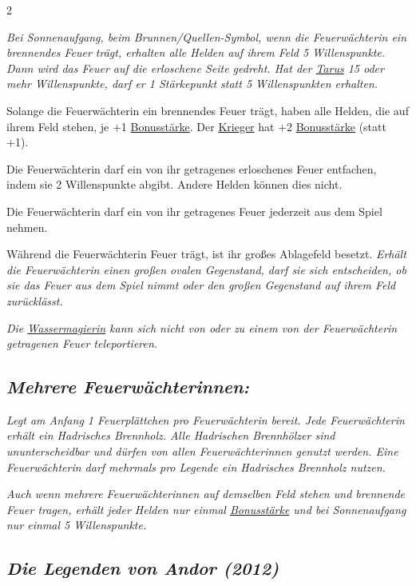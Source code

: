 \documentclass[10pt, a4paper, oneside]{book}
\newcommand{\fan}[1]{\textit{#1}}
\begin{document}
\begin{multicols*}{2}
\begin{nobgcolor}
\fan{Bei Sonnenaufgang, beim Brunnen/Quellen-Symbol, wenn die Feuerwächterin ein brennendes Feuer trägt, erhalten alle Helden auf ihrem Feld 5 Willenspunkte. Dann wird das Feuer auf die erloschene Seite gedreht. Hat der \hyperref[Tarus]{Tarus} 15 oder mehr Willenspunkte, darf er 1 Stärkepunkt statt 5 Willenspunkten erhalten.} 

Solange die Feuerwächterin ein brennendes Feuer trägt, haben alle Helden, die auf ihrem Feld stehen, je +1 \hyperref[Bonusstärke]{Bonusstärke}. Der \hyperref[Krieger]{Krieger} hat +2 \hyperref[Bonusstärke]{Bonusstärke} (statt +1).
\supercite{DeK:Begleitheft} 

Die Feuerwächterin darf ein von ihr getragenes erloschenes Feuer entfachen, indem sie 2 Willenspunkte abgibt.\supercite{DeK:Begleitheft} Andere Helden können dies nicht.\supercite{105294}

Die Feuerwächterin darf ein von ihr getragenes Feuer jederzeit aus dem Spiel nehmen.
\supercite{117803}

Während die Feuerwächterin Feuer trägt, ist ihr großes Ablagefeld besetzt. \fan{Erhält die Feuerwächterin einen großen ovalen Gegenstand, darf sie sich entscheiden, ob sie das Feuer aus dem Spiel nimmt oder den großen Gegenstand auf ihrem Feld zurücklässt.}

\fan{Die \hyperref[Wassermagierin]{Wassermagierin} kann sich nicht von oder zu einem von der Feuerwächterin getragenen Feuer teleportieren.}


\columnbreak
\subsection{\fan{Mehrere Feuerwächterinnen:}}

\fan{Legt am Anfang 1 Feuerplättchen pro Feuerwächterin bereit. Jede Feuerwächterin erhält ein Hadrisches Brennholz. Alle Hadrischen Brennhölzer sind ununterscheidbar und dürfen von allen Feuerwächterinnen genutzt werden. Eine Feuerwächterin darf mehrmals pro Legende ein Hadrisches Brennholz nutzen.}

\fan{Auch wenn mehrere Feuerwächterinnen auf demselben Feld stehen und brennende Feuer tragen, erhält jeder Helden nur einmal \hyperref[Bonusstärke]{Bonusstärke} und bei Sonnenaufgang nur einmal 5 Willenspunkte.}


\end{nobgcolor}


\begin{bgcolor}
\section{\fan{Die Legenden von Andor (2012)}}


\end{bgcolor}
\end{multicols*}
\end{document}
